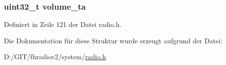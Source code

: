 \subsubsection[{volume\+\_\+ta}]{\setlength{\rightskip}{0pt plus 5cm}uint32\+\_\+t volume\+\_\+ta}\label{structradio__settings_a22b4bf888b705c01b6914d4caaed08dd}


Definiert in Zeile 121 der Datei radio.\+h.



Die Dokumentation für diese Struktur wurde erzeugt aufgrund der Datei\+:\begin{DoxyCompactItemize}
\item 
D\+:/\+G\+I\+T/fhradiov2/system/\hyperlink{radio_8h}{radio.\+h}\end{DoxyCompactItemize}
